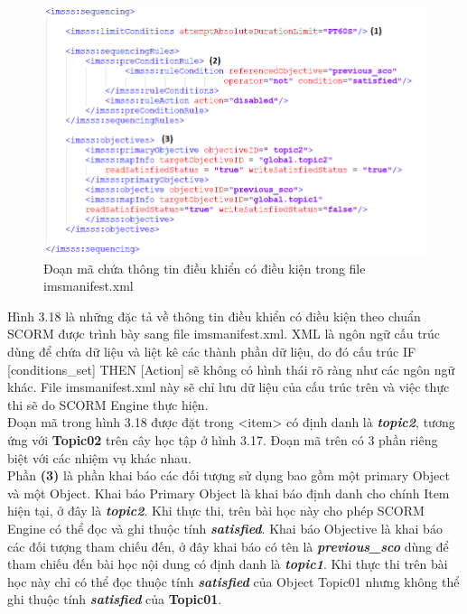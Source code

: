 \begin{center}
	\begin{figure}[htp]
		\begin{center}
			\includegraphics[width=15cm]{Chapter3/Pictures/picture318.png}
		\end{center}
		\caption{Đoạn mã chứa thông tin điều khiển có điều kiện trong file imsmanifest.xml}
		\label{refpicture412}
	\end{figure}
\end{center}

\newpage

Hình 3.18 là những đặc tả về thông tin điều khiển có điều kiện theo chuẩn SCORM được trình bày sang file imsmanifest.xml. XML là ngôn ngữ cấu trúc dùng để chứa dữ liệu và liệt kê các thành phần dữ liệu, do đó cấu trúc IF [conditions\_set] THEN [Action] sẽ không có hình thái rõ ràng như các ngôn ngữ khác. File imsmanifest.xml này sẽ chỉ lưu dữ liệu của cấu trúc trên và việc thực thi sẽ do SCORM Engine thực hiện.\\

Đoạn mã trong hình 3.18 được đặt trong <item> có định danh là \textbf{\textit{topic2}}, tương ứng với \textbf{Topic02} trên cây học tập ở hình 3.17. Đoạn mã trên có 3 phần riêng biệt với các nhiệm vụ khác nhau. \\

Phần \textbf{(3)} là phần khai báo các đối tượng sử dụng bao gồm một primary Object và một Object. Khai báo Primary Object là khai báo định danh cho chính Item hiện tại, ở đây là \textbf{\textit{topic2}}. Khi thực thi, trên bài học này cho phép SCORM Engine có thể đọc và ghi thuộc tính \textbf{\textit{satisfied}}. Khai báo Objective là khai báo các đối tượng tham chiếu đến, ở đây khai báo có tên là \textbf{\textit{previous\_sco}} dùng để tham chiếu đến bài học nội dung có định danh là \textbf{\textit{topic1}}. Khi thực thi trên bài học này chỉ có thể đọc thuộc tính \textbf{\textit{satisfied}} của Object Topic01 nhưng không thể ghi thuộc tính \textbf{\textit{satisfied}} của \textbf{Topic01}.\\

